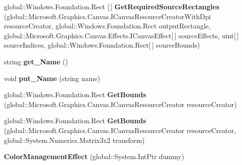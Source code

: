 \begin{DoxyCompactItemize}
global\+::\+Windows.\+Foundation.\+Rect \mbox{[}$\,$\mbox{]} {\bfseries Get\+Required\+Source\+Rectangles} (global\+::\+Microsoft.\+Graphics.\+Canvas.\+I\+Canvas\+Resource\+Creator\+With\+Dpi resource\+Creator, global\+::\+Windows.\+Foundation.\+Rect output\+Rectangle, global\+::\+Microsoft.\+Graphics.\+Canvas.\+Effects.\+I\+Canvas\+Effect\mbox{[}$\,$\mbox{]} source\+Effects, uint\mbox{[}$\,$\mbox{]} source\+Indices, global\+::\+Windows.\+Foundation.\+Rect\mbox{[}$\,$\mbox{]} source\+Bounds)
\item 
\mbox{\label{class_microsoft_1_1_graphics_1_1_canvas_1_1_effects_1_1_color_management_effect_a7e070955423224282d623d93acf46c32}} 
string {\bfseries get\+\_\+\+Name} ()
\item 
\mbox{\label{class_microsoft_1_1_graphics_1_1_canvas_1_1_effects_1_1_color_management_effect_ab9d4a85c384fc708b5c5c6de8ccec040}} 
void {\bfseries put\+\_\+\+Name} (string name)
\item 
\mbox{\label{class_microsoft_1_1_graphics_1_1_canvas_1_1_effects_1_1_color_management_effect_a1f3e48ab364e54824fccfd8a758ff7cc}} 
global\+::\+Windows.\+Foundation.\+Rect {\bfseries Get\+Bounds} (global\+::\+Microsoft.\+Graphics.\+Canvas.\+I\+Canvas\+Resource\+Creator resource\+Creator)
\item 
\mbox{\label{class_microsoft_1_1_graphics_1_1_canvas_1_1_effects_1_1_color_management_effect_acb5d9d935fe858ae3b57861c92b3d846}} 
global\+::\+Windows.\+Foundation.\+Rect {\bfseries Get\+Bounds} (global\+::\+Microsoft.\+Graphics.\+Canvas.\+I\+Canvas\+Resource\+Creator resource\+Creator, global\+::\+System.\+Numerics.\+Matrix3x2 transform)
\item 
\mbox{\label{class_microsoft_1_1_graphics_1_1_canvas_1_1_effects_1_1_color_management_effect_aa98fb6a9945a4d5480799dcff373d48b}} 
{\bfseries Color\+Management\+Effect} (global\+::\+System.\+Int\+Ptr dummy)
\item 
\mbox{\label{class_microsoft_1_1_graphics_1_1_canvas_1_1_effects_1_1_color_management_effect_a9fe37cfd32383d04402b1d66ee3eda0a}} 

\end{DoxyCompactItemize}
